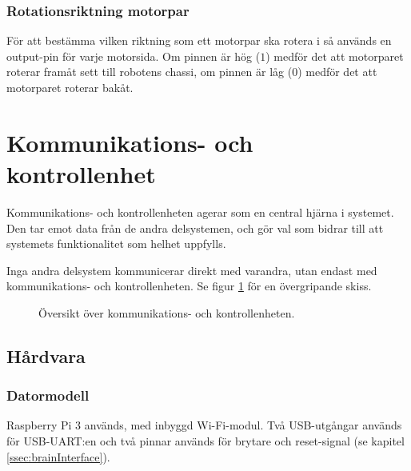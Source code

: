 \documentclass[a4paper,11pt]{article}
\begin{document}
\subsubsection{Rotationsriktning motorpar}
För att bestämma vilken riktning som ett motorpar ska rotera i så används en output-pin för varje motorsida. Om pinnen är hög ($1$) medför det att motorparet roterar framåt sett till robotens chassi, om pinnen är låg ($0$) medför det att motorparet roterar bakåt.

\clearpage
\section{Kommunikations- och kontrollenhet} \label{sec:system3}
Kommunikations- och kontrollenheten agerar som en central hjärna i systemet. Den tar emot data från de andra delsystemen, och gör val som bidrar till att systemets funktionalitet som helhet uppfylls.

Inga andra delsystem kommunicerar direkt med varandra, utan endast med kommunikations- och kontrollenheten. Se figur \ref{fig:unitBrain} för en övergripande skiss.

\begin{figure}[h!]
    \caption{Översikt över kommunikations- och kontrollenheten.  }
    \label{fig:unitBrain}
\end{figure}

\subsection{Hårdvara}

\subsubsection{Datormodell}
Raspberry Pi 3 används, med inbyggd Wi-Fi-modul. Två USB-utgångar används för USB-UART:en och två pinnar används för brytare och reset-signal (se kapitel \ref{ssec:brainInterface}).
\end{document}
